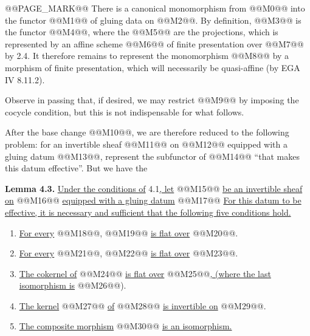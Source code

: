 \providecommand{\Isom}{\operatorname{Isom}}
\providecommand{\Coker}{\operatorname{Coker}}
\providecommand{\Ker}{\operatorname{Ker}}
\providecommand{\Supp}{\operatorname{Supp}}
\providecommand{\Ass}{\operatorname{Ass}}

@@PAGE_MARK@@
There is a canonical monomorphism from @@M0@@ into the functor @@M1@@ of gluing data on @@M2@@. By definition, @@M3@@ is the functor @@M4@@, where the @@M5@@ are the projections, which is represented by an affine scheme @@M6@@ of finite presentation over @@M7@@ by 2.4. It therefore remains to represent the monomorphism
@@M8@@
by a morphism of finite presentation, which will necessarily be quasi-affine (by EGA IV 8.11.2).

Observe in passing that, if desired, we may restrict @@M9@@ by imposing the cocycle condition, but this is not indispensable for what follows.

After the base change @@M10@@, we are therefore reduced to the following problem: for an invertible sheaf @@M11@@ on @@M12@@ equipped with a gluing datum @@M13@@, represent the subfunctor of @@M14@@ ``that makes this datum effective''. But we have the

\textbf{Lemma 4.3.} \uline{Under the conditions of} 4.1\uline{, let} @@M15@@ \uline{be an invertible sheaf on} @@M16@@ \uline{equipped with a gluing datum}
@@M17@@
\uline{For this datum to be effective, it is necessary and sufficient that the following five conditions hold.}
\begin{enumerate}[label=\arabic*)]
\item \uline{For every} @@M18@@, @@M19@@ \uline{is flat over} @@M20@@.
\item \uline{For every} @@M21@@, @@M22@@ \uline{is flat over} @@M23@@.
\item \uline{The cokernel of} @@M24@@ \uline{is flat over} @@M25@@\uline{, (where the last isomorphism is} @@M26@@).
\item \uline{The kernel} @@M27@@ \uline{of} @@M28@@ \uline{is invertible on} @@M29@@.
\item \uline{The composite morphism} @@M30@@ \uline{is an isomorphism.}
\end{enumerate}

